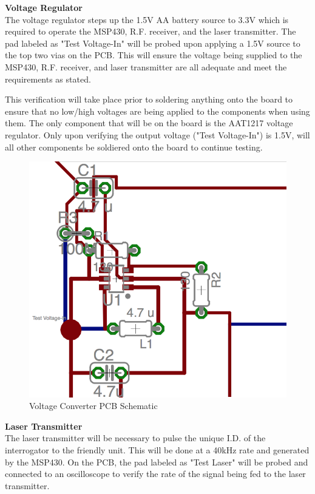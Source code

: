 \documentclass[letterpaper,10pt]{article}
\begin{document}
\begin{spacing}{1.15}
\normalsize\textbf{Voltage Regulator}\\
The voltage regulator steps up the 1.5V AA battery source to 3.3V which is required to operate the MSP430, R.F. receiver, and the laser transmitter. The pad labeled as "Test Voltage-In" will be probed upon applying a 1.5V source to the top two vias on the PCB. This will ensure the voltage being supplied to the MSP430, R.F. receiver, and laser transmitter are all adequate and meet the requirements as stated. 

This verification will take place prior to soldering anything onto the board to ensure that no low/high voltages are being applied to the components when using them. The only component that will be on the board is the AAT1217 voltage regulator. Only upon verifying the output voltage ("Test Voltage-In") is 1.5V, will all other components be soldiered onto the board to continue testing. 
\begin{figure} [H]
	\centering
	\includegraphics[scale=0.4]{converter-pcb.png}
	\caption{Voltage Converter PCB Schematic\label{fig:converter-pcb}}
\end{figure}

\normalsize\textbf{Laser Transmitter} \\
The laser transmitter will be necessary to pulse the unique I.D. of the interrogator to the friendly unit. This will be done at a 40kHz rate and generated by the MSP430. On the PCB, the pad labeled as "Test Laser" will be probed and connected to an oscilloscope to verify the rate of the signal being fed to the laser transmitter. 


\end{spacing}
\end{document}
